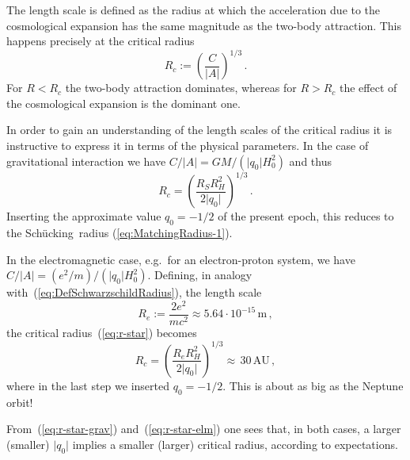 \documentclass
[rmp,aps,twocolumn,showpacs,preprintnumbers,amsmath,amssymb]{revtex4}
\theoremstyle{plain}
\theoremstyle{definition}
\theoremstyle{remark}
\newcommand{\abs}[1]{\lvert#1\rvert}          %
\newcommand{\Schuecking}{Sch\"ucking}
\begin{document}
The length scale is defined as the radius at which the acceleration due to 
the cosmological expansion has the same magnitude as the two-body attraction. 
This happens precisely at the critical radius
%
\begin{equation}\label{eq:r-star}
  R_c := \left( \frac{C}{|A|} \right)^{1/3} \,.
\end{equation}
%
For $R<R_c$ the two-body attraction dominates, whereas for $R>R_c$ 
the effect of the cosmological expansion is the dominant one. 

In order to gain an understanding of the length scales of the critical radius
it is instructive to express it in terms of the physical parameters. In the 
case of gravitational interaction we have $C/\abs{A}=GM/(\abs{q_0}H_0^2)$ and 
thus
%
\begin{equation}\label{eq:r-star-grav}
  R_c = \left( \frac{R_S R_H^2}{2\abs{q_0}} \right)^{1/3} \,.
\end{equation}
%
Inserting the approximate value $q_0=-1/2$ of the present epoch, this 
reduces to the \Schuecking\ radius (\ref{eq:MatchingRadius-1}). 

In the electromagnetic case, e.g.~for an electron-proton system, we have 
$C/\abs{A}=(e^2/m)/(\abs{q_0}H_0^2)$. Defining, in analogy 
with~(\ref{eq:DefSchwarzschildRadius}), the length scale 
%
\begin{equation}\label{eq:electron-proton-length}
  R_e := \frac{2e^2}{mc^2} \approx 5.64 \cdot 10^{-15}\,\textrm{m} \,,
\end{equation}
%
the critical radius~(\ref{eq:r-star}) becomes 
%
\begin{equation}\label{eq:r-star-elm}
  R_c = \left( \frac{R_e R_H^2}{2\abs{q_0}} \right)^{1/3}
  \approx \, 30 \, \mathrm{AU}\,,
\end{equation}
%
where in the last step we inserted $q_0=-1/2$. This 
is about as big as the Neptune orbit! 

From~(\ref{eq:r-star-grav}) and~(\ref{eq:r-star-elm}) one sees that, 
in both cases, a larger (smaller) $\abs{q_0}$ implies a smaller (larger) 
critical radius, according to expectations. 
\end{document}
